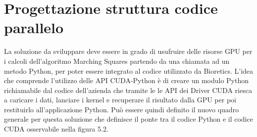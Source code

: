 \documentclass[12pt,a4paper]{report}
\begin{document}
\newpage
\section{Progettazione struttura codice parallelo}
La soluzione da sviluppare deve essere in grado di usufruire delle risorse GPU per i calcoli dell'algoritmo Marching Squares partendo da una chiamata ad un metodo Python, per poter essere integrato al codice utilizzato da Bioretics. \newline
L'idea che comprende l'utilizzo delle API CUDA-Python è di creare un modulo Python richiamabile dal codice dell'azienda che tramite le le API dei Driver CUDA riesca a caricare i dati, lanciare i kernel e recuperare il risultato dalla GPU per poi restituirlo all'applicazione Python. \newline
Può essere quindi definito il nuovo quadro generale per questa soluzione che definisce il ponte tra il codice Python e il codice CUDA osservabile nella figura 5.2. \\[10pt]

\begin{figure}[H]
\centering
\begin{floatrow}[1]
\end{floatrow}
\end{figure} \newpage
\end{document}
